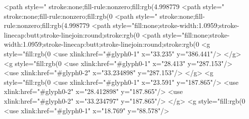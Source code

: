 <path style=" stroke:none;fill-rule:nonzero;fill:rgb(4.998779%
<path style=" stroke:none;fill-rule:nonzero;fill:rgb(0%
<path style=" stroke:none;fill-rule:nonzero;fill:rgb(4.998779%
<path style="fill:none;stroke-width:1.0959;stroke-linecap:butt;stroke-linejoin:round;stroke:rgb(0%
<path style="fill:none;stroke-width:1.0959;stroke-linecap:butt;stroke-linejoin:round;stroke:rgb(0%
<g style="fill:rgb(0%
  <use xlink:href="#glyph0-1" x="33.235" y="386.441"/>
</g>
<g style="fill:rgb(0%
  <use xlink:href="#glyph0-1" x="28.413" y="287.153"/>
  <use xlink:href="#glyph0-2" x="33.234898" y="287.153"/>
</g>
<g style="fill:rgb(0%
  <use xlink:href="#glyph0-1" x="23.591" y="187.865"/>
  <use xlink:href="#glyph0-2" x="28.412898" y="187.865"/>
  <use xlink:href="#glyph0-2" x="33.234797" y="187.865"/>
</g>
<g style="fill:rgb(0%
  <use xlink:href="#glyph0-1" x="18.769" y="88.578"/>
